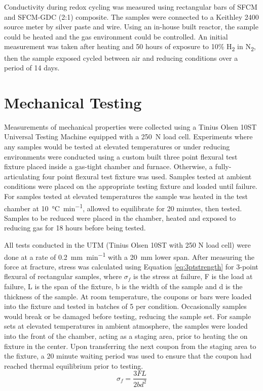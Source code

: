     Conductivity during redox cycling was measured using rectangular bars of SFCM and SFCM-GDC (2:1) composite.
    The samples were connected to a Keithley 2400 source meter by silver paste and wire.
    Using an in-house built reactor, the sample could be heated and the gas environment could be controlled.
    An initial measurement was taken after heating and 50 hours of exposure to 10\% H\textsubscript{2} in N\textsubscript{2}, then the sample exposed cycled between air and reducing conditions over a period of 14 days.

\section{Mechanical Testing}
    Measurements of mechanical properties were collected using a Tinius Olsen 10ST Universal Testing Machine equipped with a \SI{250}{N} load cell.
    Experiments where any samples would be tested at elevated temperatures or under reducing environments were conducted using a custom built three point flexural test fixture placed inside a gas-tight chamber and furnace.
    Otherwise, a fully-articulating four point flexural test fixture was used.
    Samples tested at ambient conditions were placed on the appropriate testing fixture and loaded until failure.
    For samples tested at elevated temperatures the sample was heated in the test chamber at \SI{10}{\celsius\per\minute}, allowed to equilibrate for 20 minutes, then tested.
    Samples to be reduced were placed in the chamber, heated and exposed to reducing gas for 18 hours before being tested.

    All tests conducted in the UTM (Tinius Olsen 10ST with 250 N load cell) were done at a rate of \SI{0.2}{\milli\meter\per\minute} with a \SI{20}{\milli\meter} lower span.
    After measuring the force at fracture, stress was calculated using Equation \ref{eq:3ptstrength}
    for 3-point flexural of rectangular samples, where \(\sigma_{f}\) is the stress at failure, F is the load at failure, L is the span of the fixture, b is the width of the sample and d is the thickness of the sample.
    At room temperature, the coupons or bars were loaded into the fixture and tested in batches of 5 per condition.
    Occasionally samples would break or be damaged before testing, reducing the sample set.
    For sample sets at elevated temperatures in ambient atmosphere, the samples were loaded into the front of the chamber, acting as a staging area,
    prior to heating the on fixture in the center.
    Upon transferring the next coupon from the staging area to the fixture, a 20 minute waiting period was used to ensure that the coupon had reached thermal equilibrium prior to testing.
    \begin{equation}
        \sigma_{f} = \frac{3FL}{2bd^{2}}
        \label{eq:3ptstrength}
    \end{equation}

